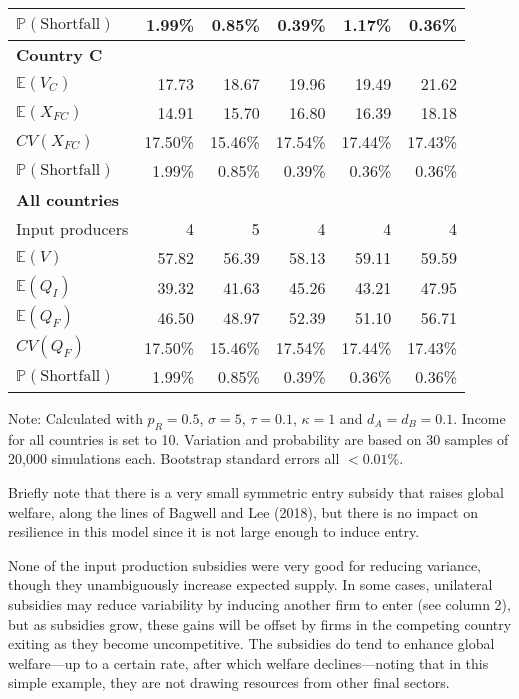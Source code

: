 \documentclass{article}
\begin{document}
\begin{table}
\begin{threeparttable}
\begin{tabular}{lrrrrr}
            $\mathbb{P}(\text{Shortfall})$ & 1.99\% & 0.85\% & 0.39\% & 1.17\% & 0.36\% \\ 
            \midrule
            \textbf{Country C} \\
            $\mathbb{E}(V_C)$ & 17.73 & 18.67 & 19.96 & 19.49 & 21.62 \\
            $\mathbb{E}(X_{FC})$ & 14.91 & 15.70 & 16.80 & 16.39 & 18.18 \\
            $CV(X_{FC})$ & 17.50\% & 15.46\% & 17.54\% & 17.44\% & 17.43\% \\
            $\mathbb{P}(\text{Shortfall})$ & 1.99\% & 0.85\% & 0.39\% & 0.36\% & 0.36\% \\ 
            \midrule
            \textbf{All countries} \\
            Input producers & 4 & 5 & 4 & 4 & 4 \\
            $\mathbb{E}(V)$ & 57.82 & 56.39 & 58.13 & 59.11 & 59.59 \\
            $\mathbb{E}(Q_{I})$ & 39.32 & 41.63 & 45.26 & 43.21 & 47.95 \\
            $\mathbb{E}(Q_{F})$ & 46.50 & 48.97 & 52.39 & 51.10 & 56.71 \\
            $CV(Q_{F})$ & 17.50\% & 15.46\% & 17.54\% & 17.44\% & 17.43\% \\
            $\mathbb{P}(\text{Shortfall})$ & 1.99\% & 0.85\% & 0.39\% & 0.36\% & 0.36\% \\ 
            \bottomrule
        \end{tabular}
        \begin{tablenotes}
            \small \item Note: Calculated with $p_R = 0.5$, $\sigma = 5$, $\tau = 0.1$, $\kappa = 1$ and $d_A = d_B = 0.1$. Income for all countries is set to 10. Variation and probability are based on 30 samples of 20,000 simulations each. Bootstrap standard errors all $<0.01\%$.
        \end{tablenotes}
    \end{threeparttable}
\end{table}

Briefly note that there is a very small symmetric entry subsidy that raises global welfare, along the lines of Bagwell and Lee (2018), but there is no impact on resilience in this model since it is not large enough to induce entry.

None of the input production subsidies were very good for reducing variance, though they unambiguously increase expected supply. In some cases, unilateral subsidies may reduce variability by inducing another firm to enter (see column 2), but as subsidies grow, these gains will be offset by firms in the competing country exiting as they become uncompetitive. The subsidies do tend to enhance global welfare---up to a certain rate, after which welfare declines---noting that in this simple example, they are not drawing resources from other final sectors.
\end{document}
